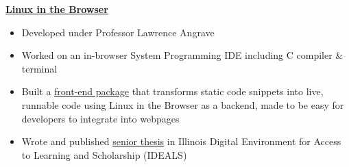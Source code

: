 \documentclass[10pt,a4paper,sans]{moderncv}        %
\begin{document}
\vspace{3pt}
\textbf{\href{http://cs-education.github.io/sys/}{Linux in the Browser}}
\begin{itemize}
  \item Developed under Professor Lawrence Angrave
  \item Worked on an in-browser System Programming IDE including C compiler \& terminal
  \item Built a {\color{blue}\underline{\href{https://cs-education.github.io/elc-dev/}{front-end package}}} that transforms static code snippets into live, runnable
        code using Linux in the Browser as a backend, made to be easy for developers to integrate into
        webpages
  \item Wrote and published {\color{blue}\underline{\href{https://www.ideals.illinois.edu/handle/2142/96030}{senior thesis}}} in Illinois Digital Environment for Access to Learning and Scholarship (IDEALS)
\end{itemize}


% 


\end{document}
